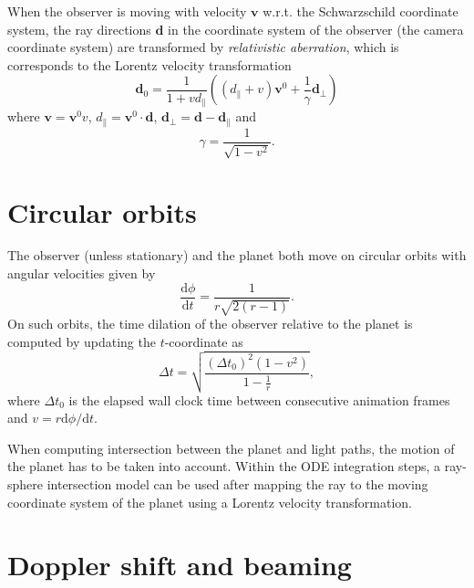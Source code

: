 \documentclass[a4paper,12pt]{article}
\def\mb{\boldsymbol}
\def\d{{\mathrm d}}
\begin{document}
When the observer is moving with velocity $\mb v$ w.r.t. the Schwarzschild coordinate system, the ray directions $\mb d$ in the coordinate system of the observer (the camera coordinate system) are transformed by \emph{relativistic aberration}, which is corresponds to the Lorentz velocity transformation
$$
  \mb d_0 = \frac1{1 + v d_\parallel}\left((d_\parallel + v)\mb v^0 + \frac1{\gamma} \mb d_\perp\right)
$$
where $\mb v = \mb v^0 v$, $d_\parallel = \mb v^0 \cdot \mb d$, $\mb d_\perp = \mb d - \mb d_\parallel$ and
\begin{equation}\label{lorentz-factor}
  \gamma = \frac1{\sqrt{1-v^2}}.
\end{equation}

\section*{Circular orbits}

The observer (unless stationary) and the planet both move on circular orbits with angular velocities given by \cite{antonell}
\begin{equation}\label{circular-orbit-angular-velocity}
  \frac{\d \phi}{\d t} = \frac1{r\sqrt{2(r-1)}}.
\end{equation}
On such orbits, the time dilation of the observer relative to the planet is computed by updating the $t$-coordinate as
$$
  \Delta t = \sqrt{\frac{(\Delta t_0)^2  (1 - v^2)}{1-\frac1r}},
$$
where $\Delta t_0$ is the elapsed wall clock time between consecutive animation frames and $v = r \d \phi / \d t$. %

When computing intersection between the planet and light paths, the motion of the planet has to be taken into account. Within the ODE integration steps, a ray-sphere intersection model can be used after mapping the ray to the moving coordinate system of the planet using a Lorentz velocity transformation.

\section*{Doppler shift and beaming}
\end{document}
